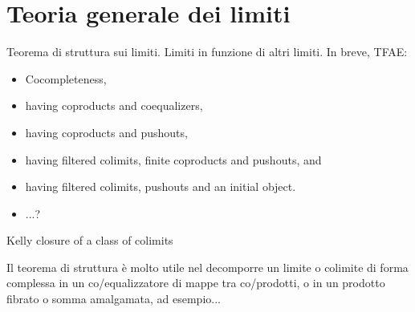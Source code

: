 \section{Teoria generale dei limiti}

\begin{theorem}
	Teorema di struttura sui limiti. Limiti in funzione di altri limiti. In breve, TFAE:
	\begin{itemize}
		\item 	Cocompleteness,
		\item having coproducts and coequalizers,
		\item having coproducts and pushouts,
		\item having filtered colimits, finite coproducts and pushouts, and
		\item having filtered colimits, pushouts and an initial object.
		\item ...?
	\end{itemize}
	Kelly closure of a class of colimits
\end{theorem}
Il teorema di struttura è molto utile nel decomporre un limite o colimite di forma complessa in un co/equalizzatore di mappe tra co/prodotti, o in un prodotto fibrato o somma amalgamata, ad esempio...
